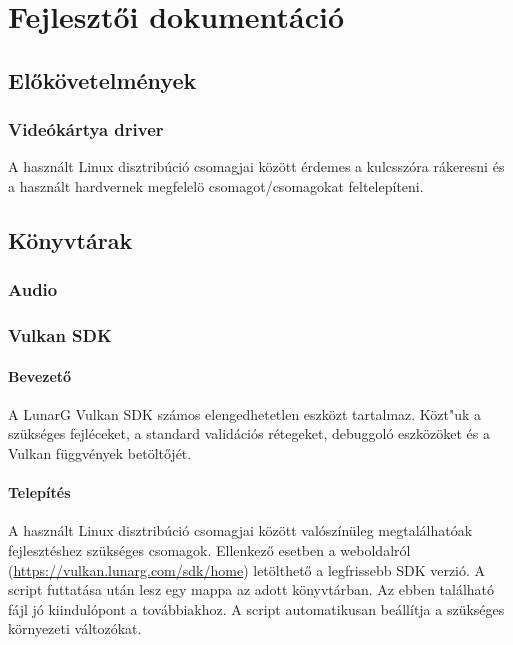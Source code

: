 
\section{Fejleszt\H oi dokument\'aci\'o}



%


\subsection{El\H ok\"ovetelm\'enyek}
\subsubsection{Vide\'ok\'artya driver}
A haszn\'alt Linux disztrib\'uci\'o csomagjai k\"oz\"ott \'erdemes a  kulcssz\'ora r\'akeresni \'es a haszn\'alt hardvernek megfelel\"o csomagot/csomagokat feltelep\'iteni.
\subsection{K\"onyvt\'arak}

\subsubsection{Audio}

\subsubsection{Vulkan SDK}
\paragraph{Bevezet\H o}
A LunarG Vulkan SDK sz\'amos elengedhetetlen eszk\"ozt tartalmaz. K\"ozt"uk a sz\"uks\'eges fejl\'eceket, a standard valid\'aci\'os r\'etegeket, debuggol\'o eszk\"oz\"oket \'es a Vulkan f\"uggv\'enyek bet\"olt\H oj\'et. 
\paragraph{Telep\'it\'es}
A haszn\'alt Linux disztrib\'uci\'o csomagjai k\"oz\"ott val\'osz\'in\"uleg megtal\'alhat\'oak fejleszt\'eshez sz\"uks\'eges csomagok. 
\newline
Ellenkez\H o esetben a weboldalr\'ol (\url{https://vulkan.lunarg.com/sdk/home}) let\"olthet\H o a legfrissebb SDK verzi\'o.
A script futtat\'asa ut\'an lesz egy  mappa az adott k\"onyvt\'arban.
Az ebben tal\'alhat\'o  f\'ajl j\'o kiindul\'opont a tov\'abbiakhoz.
A  script automatikusan be\'all\'itja a sz\"uks\'eges k\"ornyezeti v\'altoz\'okat.
